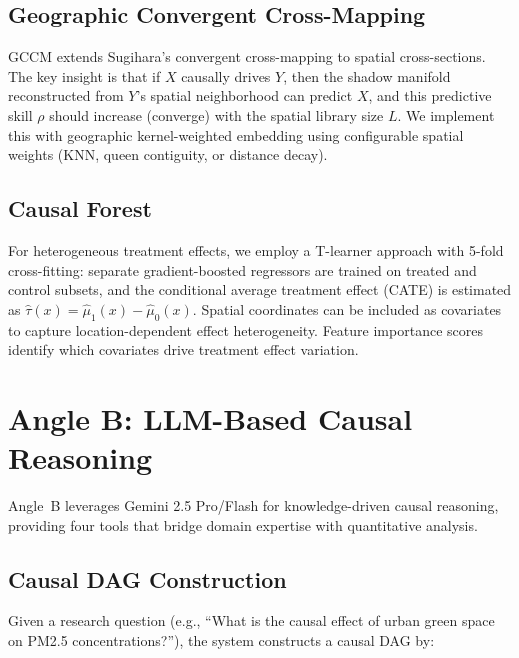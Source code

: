 \documentclass{article}
\begin{document}
\subsection{Geographic Convergent Cross-Mapping}

GCCM extends Sugihara's convergent cross-mapping \citep{sugihara2012detecting} to spatial cross-sections. The key insight is that if $X$ causally drives $Y$, then the shadow manifold reconstructed from $Y$'s spatial neighborhood can predict $X$, and this predictive skill $\rho$ should increase (converge) with the spatial library size $L$. We implement this with geographic kernel-weighted embedding using configurable spatial weights (KNN, queen contiguity, or distance decay).

\subsection{Causal Forest}

For heterogeneous treatment effects, we employ a T-learner approach with 5-fold cross-fitting: separate gradient-boosted regressors are trained on treated and control subsets, and the conditional average treatment effect (CATE) is estimated as $\hat{\tau}(x) = \hat{\mu}_1(x) - \hat{\mu}_0(x)$. Spatial coordinates can be included as covariates to capture location-dependent effect heterogeneity. Feature importance scores identify which covariates drive treatment effect variation.


\section{Angle B: LLM-Based Causal Reasoning}
\label{sec:angle_b}

Angle~B leverages Gemini 2.5 Pro/Flash for knowledge-driven causal reasoning, providing four tools that bridge domain expertise with quantitative analysis.

\subsection{Causal DAG Construction}

Given a research question (e.g., ``What is the causal effect of urban green space on PM2.5 concentrations?''), the system constructs a causal DAG by:
\end{document}
